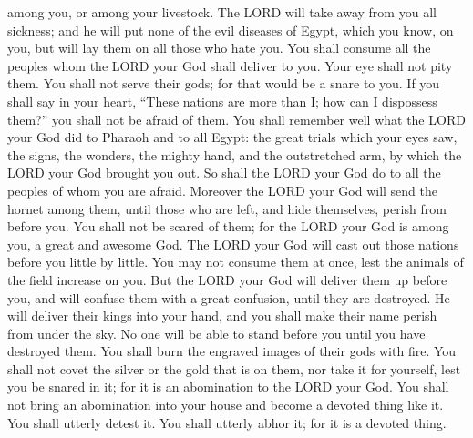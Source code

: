 	among you, or among your livestock.
	\myverse{}The LORD will take away from you all sickness; and he will put none of the
	evil diseases of Egypt, which you know, on you, but will lay them on all those who hate you.
	\myverse{}You shall consume all the peoples whom the LORD your God shall deliver to
	you. Your eye shall not pity them. You shall not serve their gods; for that would be a snare to you.	
	\myverse{}If you shall say in your heart, “These nations are more than I; how can I
	dispossess them?”	
	\myverse{}you shall not be afraid of them. You shall remember well what the LORD your
	God did to Pharaoh and to all Egypt:	
	\myverse{}the great trials which your eyes saw, the signs, the wonders, the mighty hand,
	and the outstretched arm, by which the LORD your God brought you out. So shall the LORD your God do to
	all the peoples of whom you are afraid.	
	\myverse{}Moreover the LORD your God will send the hornet among them, until those who
	are left, and hide themselves, perish from before you.	
	\myverse{}You shall not be scared of them; for the LORD your God is among you, a great
	and awesome God.
	\myverse{}The LORD your God will cast out those nations before you little by little.
	You may not consume them at once, lest the animals of the field increase on you.
	\myverse{}But the LORD your God will deliver them up before you, and will confuse them
	with a great confusion, until they are destroyed.
	\myverse{}He will deliver their kings into your hand, and you shall make their name
	perish from under the sky. No one will be able to stand before you until you have destroyed them.
	\myverse{}You shall burn the engraved images of their gods with fire. You shall not
	covet the silver or the gold that is on them, nor take it for yourself, lest you be snared in it; for
	it is an abomination to the LORD your God.	
	\myverse{}You shall not bring an abomination into your house and become a devoted thing
	like it. You shall utterly detest it. You shall utterly abhor it; for it is a devoted thing.
	
